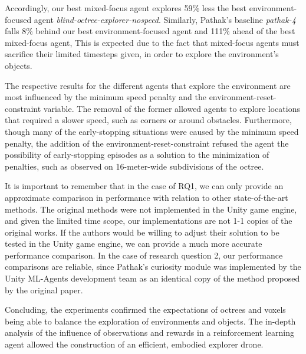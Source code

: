 
        Accordingly, our best mixed-focus agent explores 59\% less the best environment-focused agent \textit{blind-octree-explorer-nospeed}. 
        Similarly, Pathak's baseline \textit{pathak-4} falls 8\% behind our best environment-focused agent and 111\% ahead of the best mixed-focus agent, 
        This is expected due to the fact that mixed-focus agents must sacrifice their limited timesteps given, in order to explore the environment's objects.
        
        The respective results for the different agents that explore the environment are most influenced by the minimum speed penalty and the environment-reset-constraint variable. The removal of the former allowed agents to explore locations that required a slower speed, such as corners or around obstacles. Furthermore, though many of the early-stopping situations were caused by the minimum speed penalty, the addition of the environment-reset-constraint refused the agent the possibility of early-stopping episodes as a solution to the minimization of penalties, such as observed on 16-meter-wide subdivisions of the octree.
        
        

        
        It is important to remember that in the case of RQ1, we can only provide an approximate comparison in performance with relation to other state-of-the-art methods. The original methods were not implemented in the Unity game engine, and given the limited time scope, our implementations are not 1-1 copies of the original works. If the authors would be willing to adjust their solution to be tested in the Unity game engine, we can provide a much more accurate performance comparison. In the case of research question 2, our performance comparisons are reliable, since Pathak's curiosity module was implemented by the Unity ML-Agents development team as an identical copy of the method proposed by the original paper.
        
        Concluding, the experiments confirmed the expectations of octrees and voxels being able to balance the exploration of environments and objects. The in-depth analysis of the influence of observations and rewards in a reinforcement learning agent allowed the construction of an efficient, embodied explorer drone.
        
